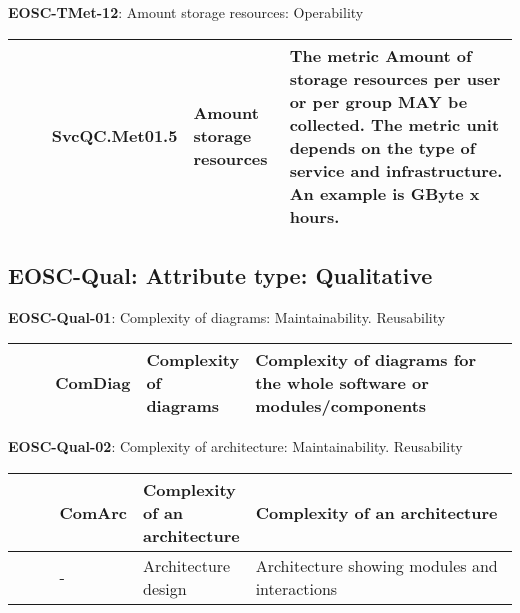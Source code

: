 \textbf{EOSC-TMet-12}: Amount storage resources: Operability
\nopagebreak[4]
\begin{center}
    \tabletail{\hline}
    \tiny
    \begin{supertabular}{|p{0.10\linewidth}|p{0.10\linewidth}|p{0.20\linewidth}|p{0.60\linewidth}|} \hline
        \cite{orviz_fernandez_eosc-synergy_2020} & SvcQC.Met01.5 & Amount storage resources & The metric Amount of storage resources per user or per group MAY be collected. The metric unit depends on the type of service and infrastructure. An example is GByte x hours.\\ \hline
    \end{supertabular}
\end{center}

\subsection{EOSC-Qual: Attribute type: Qualitative}

\textbf{EOSC-Qual-01}: Complexity of diagrams: Maintainability. Reusability
\nopagebreak[4]
\begin{center}
    \tabletail{\hline}
    \tiny
    \begin{supertabular}{|p{0.10\linewidth}|p{0.10\linewidth}|p{0.20\linewidth}|p{0.60\linewidth}|} \hline
        \cite{montagud_systematic_2012} & ComDiag & Complexity of diagrams & Complexity of diagrams for the whole software or modules/components\\ \hline
    \end{supertabular}
\end{center}

\textbf{EOSC-Qual-02}: Complexity of architecture: Maintainability. Reusability
\nopagebreak[4]
\begin{center}
    \tabletail{\hline}
    \tiny
    \begin{supertabular}{|p{0.10\linewidth}|p{0.10\linewidth}|p{0.20\linewidth}|p{0.60\linewidth}|} \hline
        \cite{montagud_systematic_2012} & ComArc & Complexity of an architecture & Complexity of an architecture\\ \hline
        \cite{zuser_software_2005} & - & Architecture design & Architecture showing modules and interactions\\ \hline
    \end{supertabular}
\end{center}

